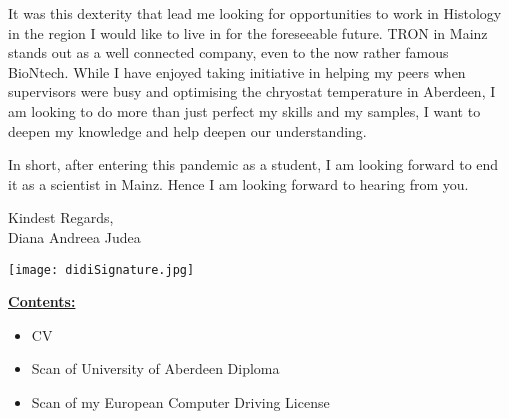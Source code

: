 \documentclass[paper=a4,fontsize=11pt]{scrartcl} %
\newcommand{\sepspace}{\vspace*{1em}}		%
\newcommand{\NewPart}[1]{\section*{\uppercase{#1}}}
\begin{document}
  \sepspace 
  \noindent It was this dexterity that lead me looking for opportunities to
  work in Histology in the region I would like to live in for the foreseeable
  future.  TRON in Mainz stands out as a well connected company, even to the
  now rather famous BioNtech.  While I have enjoyed taking initiative in
  helping my peers when supervisors were busy and optimising the chryostat
  temperature in Aberdeen, I am looking to do more than just perfect my skills
  and my samples, I want to deepen my knowledge and help deepen our
  understanding.  

  \sepspace

  \noindent In short, after entering this pandemic as a student, I am looking
  forward to end it as a scientist in Mainz.  Hence I am looking forward to
  hearing from you.
  \sepspace

  \noindent
  Kindest Regards,\\
  Diana Andreea Judea 


  \vspace{3pt}
  \texttt{[image: didiSignature.jpg]}\hspace{2.5cm}

  \vspace*{\fill}
  
  \textbf{\underline{Contents:}}
  \footnotesize
  \begin{itemize}[noitemsep,topsep=0pt]
    \setlength\itemsep{1pt}
    \item CV
    \item Scan of University of Aberdeen Diploma
    \item Scan of my European Computer Driving License
  \end{itemize}
  \normalsize
  
  \cleardoublepage
  
  \cleardoublepage
  
\end{document}
